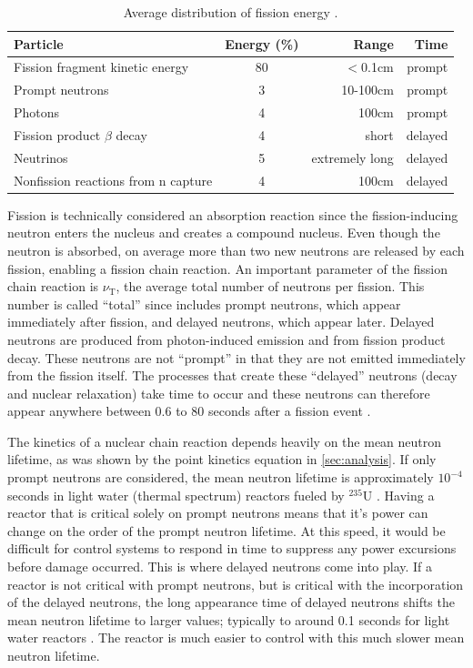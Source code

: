\begin{table}[h]
\centering
\caption[Average distribution of fission energy.]{Average distribution of fission energy \cite{duderstadt}.\label{fission_dist}}
\begin{tabular}{| l | c | r | r |}
\hline
Particle & Energy (\%) & Range & Time \\
\hline
Fission fragment kinetic energy & 80 & $<$0.1cm & prompt \\
\hline
Prompt neutrons & 3 & 10-100cm & prompt \\
\hline
Photons & 4 & 100cm & prompt \\
\hline
Fission product $\beta$ decay & 4 & short & delayed \\
\hline
Neutrinos &  5 & extremely long & delayed \\
\hline
Nonfission reactions from n capture & 4 & 100cm & delayed \\
\hline
\end{tabular}
\end{table}

Fission is technically considered an absorption reaction since the fission-inducing neutron enters the nucleus and creates a compound nucleus.  Even though the neutron is absorbed, on average more than two new neutrons are released by each fission, enabling a fission chain reaction.  An important parameter of the fission chain reaction is $\nu_\mathrm{T}$, the average total number of neutrons per fission.  This number is called ``total'' since includes prompt neutrons, which appear immediately after fission, and delayed neutrons, which appear later.  Delayed neutrons are produced from photon-induced emission and from fission product decay.  These neutrons are not ``prompt'' in that they are not emitted immediately from the fission itself.  The processes that create these ``delayed'' neutrons (decay and nuclear relaxation) take time to occur and these neutrons can therefore appear anywhere between 0.6 to 80 seconds after a fission event \cite{duderstadt}. 

The kinetics of a nuclear chain reaction depends heavily on the mean neutron lifetime, as was shown by the point kinetics equation in \ref{sec:analysis}.  If only prompt neutrons are considered, the mean neutron lifetime is approximately $10^{-4}$ seconds in light water (thermal spectrum) reactors fueled by $^{235}$U \cite{duderstadt}.  Having a reactor that is critical solely on prompt neutrons means that it's power can change on the order of the prompt neutron lifetime.  At this speed, it would be difficult for control systems to respond in time to suppress any power excursions before damage occurred.  This is where delayed neutrons come into play.  If a reactor is not critical with prompt neutrons, but is critical with the incorporation of the delayed neutrons, the long appearance time of delayed neutrons shifts the mean neutron lifetime to larger values; typically to around 0.1 seconds for light water reactors \cite{duderstadt}.  The reactor is much easier to control with this much slower mean neutron lifetime.

